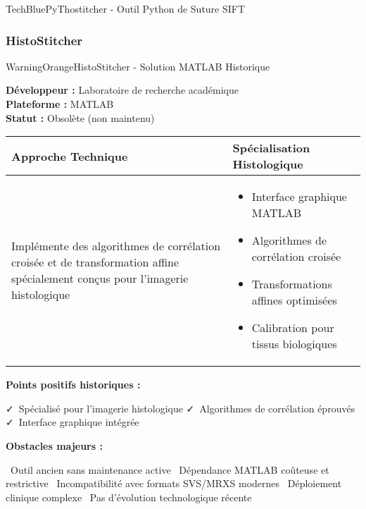\documentclass[12pt,a4paper]{report}
\newcommand{\pro}[1]{\textcolor{SuccessGreen}{\faCheck\ #1}}
\newcommand{\con}[1]{\textcolor{DangerRed}{\faTimes\ #1}}
\begin{document}
\begin{}
\begin{}
\begin{}
\begin{}
\begin{techbox}{TechBlue}{PyThostitcher - Outil Python de Suture SIFT}
\end{techbox}

\subsubsection{HistoStitcher}

\begin{techbox}{WarningOrange}{HistoStitcher - Solution MATLAB Historique}

\textbf{Développeur :} Laboratoire de recherche académique \\
\textbf{Plateforme :} MATLAB \\
\textbf{Statut :} Obsolète (non maintenu)

\vspace{0.5cm}

\begin{tabularx}{\textwidth}{|X|X|}
\hline
\rowcolor{LightGray}
\textbf{Approche Technique} & \textbf{Spécialisation Histologique} \\
\hline
Implémente des algorithmes de corrélation croisée et de transformation affine spécialement conçus pour l'imagerie histologique &
\begin{itemize}[nosep]
\item Interface graphique MATLAB
\item Algorithmes de corrélation croisée
\item Transformations affines optimisées
\item Calibration pour tissus biologiques
\end{itemize} \\
\hline
\end{tabularx}

\vspace{0.5cm}

\textbf{Points positifs historiques :}
\begin{itemize}[leftmargin=*]
    \pro{Spécialisé pour l'imagerie histologique}
    \pro{Algorithmes de corrélation éprouvés}
    \pro{Interface graphique intégrée}
\end{itemize}

\textbf{Obstacles majeurs :}
\begin{itemize}[leftmargin=*]
    \con{Outil ancien sans maintenance active}
    \con{Dépendance MATLAB coûteuse et restrictive}
    \con{Incompatibilité avec formats SVS/MRXS modernes}
    \con{Déploiement clinique complexe}
    \con{Pas d'évolution technologique récente}
\end{itemize}


\end{techbox}
\end{}
\end{}
\end{}
\end{}
\end{document}
